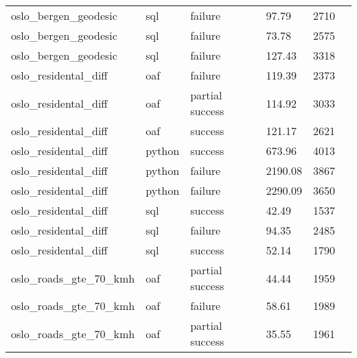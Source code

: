 \begin{longtable}{lp{1.8cm}p{1.8cm}p{1.8cm}p{1.8cm}p{1.8cm}}
    oslo\_bergen\_geodesic     & sql                          & failure          & 97.79                         & 2710            \\
    oslo\_bergen\_geodesic     & sql                          & failure          & 73.78                         & 2575            \\
    oslo\_bergen\_geodesic     & sql                          & failure          & 127.43                        & 3318            \\
    oslo\_residental\_diff     & oaf                          & failure          & 119.39                        & 2373            \\
    oslo\_residental\_diff     & oaf                          & partial success  & 114.92                        & 3033            \\
    oslo\_residental\_diff     & oaf                          & success          & 121.17                        & 2621            \\
    oslo\_residental\_diff     & python                       & success          & 673.96                        & 4013            \\
    oslo\_residental\_diff     & python                       & failure          & 2190.08                       & 3867            \\
    oslo\_residental\_diff     & python                       & failure          & 2290.09                       & 3650            \\
    oslo\_residental\_diff     & sql                          & success          & 42.49                         & 1537            \\
    oslo\_residental\_diff     & sql                          & failure          & 94.35                         & 2485            \\
    oslo\_residental\_diff     & sql                          & success          & 52.14                         & 1790            \\
    oslo\_roads\_gte\_70\_kmh  & oaf                          & partial success  & 44.44                         & 1959            \\
    oslo\_roads\_gte\_70\_kmh  & oaf                          & failure          & 58.61                         & 1989            \\
    oslo\_roads\_gte\_70\_kmh  & oaf                          & partial success  & 35.55                         & 1961            \\

\end{longtable}
